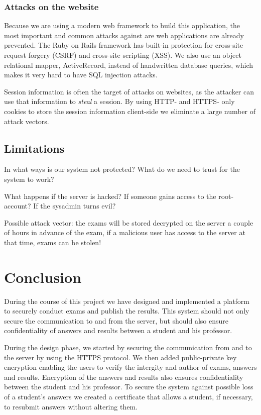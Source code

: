 \documentclass[12pt]{article}
\begin{document}
\subsubsection{Attacks on the website}

Because we are using a modern web framework to build this application, the most
important and common attacks against are web applications are already prevented.
The Ruby on Rails framework has built-in protection for cross-site request
forgery (CSRF) and cross-site scripting (XSS). We also use an object relational
mapper, ActiveRecord, instead of handwritten database queries, which makes it
very hard to have SQL injection attacks.

Session information is often the target of attacks on websites, as the attacker
can use that information to \emph{steal} a session. By using HTTP- and HTTPS-
only cookies to store the session information client-side we eliminate a large
number of attack vectors.

\subsection{Limitations}
\label{subsec:req-limitations}


In what ways is our system not protected? What do we need to trust for the
system to work?

What happens if the server is hacked? If someone gains access to the
root-account? If the sysadmin turns evil?

Possible attack vector: the exams will be stored decrypted on the server a
couple of hours in advance of the exam, if a malicious user has access to the
server at that time, exams can be stolen!

\section{Conclusion}
\label{sec:conclusion}

During the course of this project we have designed and implemented a platform
to securely conduct exams and publish the results. This system should not only
secure the communication to and from the server, but should also ensure
confidentiality of answers and results between a student and his professor.

During the design phase, we started by securing the communication from and to
the server by using the HTTPS protocol. We then added public-private key
encryption enabling the users to verify the intergity and author of exams,
answers and results. Encryption of the answers and results also ensures
confidentiality between the student and his professor. To secure the system
against possible loss of a student's answers we created a certificate that
allows a student, if necessary, to resubmit answers without altering them.
\end{document}

